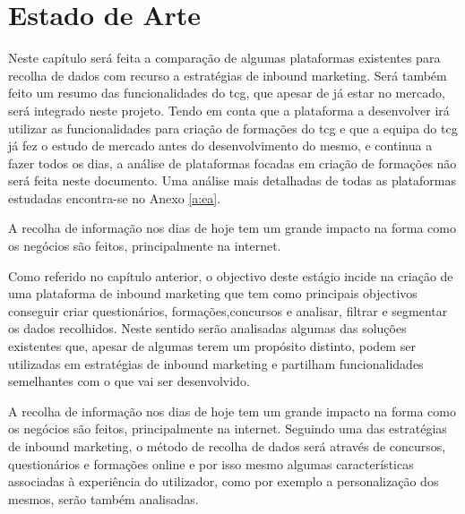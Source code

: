 \chapter{Estado de Arte}
\label{sec:estado-arte}

Neste capítulo será feita a comparação de algumas plataformas existentes para recolha de dados com recurso a estratégias de inbound marketing. Será também feito um resumo das funcionalidades do \acrshort{tcg}, que apesar de já estar no mercado, será integrado neste projeto. Tendo em conta que a plataforma a desenvolver irá utilizar as funcionalidades para criação de formações do \acrshort{tcg} e que a equipa do \acrlong{tcg} já fez o estudo de mercado antes do desenvolvimento do mesmo, e continua a fazer todos os dias, a análise de plataformas focadas em criação de formações não será feita neste documento. Uma análise mais detalhadas de todas as plataformas estudadas encontra-se no Anexo \ref{a:ea}.

A recolha de informação nos dias de hoje tem um grande impacto na forma como os negócios são feitos, principalmente na internet.

Como referido no capítulo anterior, o objectivo deste estágio incide na criação de uma plataforma de inbound marketing que tem como principais objectivos conseguir criar  questionários, formações,concursos e analisar, filtrar e segmentar os dados recolhidos. Neste sentido serão analisadas algumas das soluções existentes que, apesar de algumas terem um propósito distinto, podem ser utilizadas em estratégias de inbound marketing e partilham funcionalidades semelhantes com o que vai ser desenvolvido. 

A recolha de informação nos dias de hoje tem um grande impacto na forma como os negócios são feitos, principalmente na internet. Seguindo uma das estratégias de inbound marketing, o método de recolha de dados será através de concursos, questionários e formações online e por isso mesmo algumas características associadas à experiência do utilizador, como por exemplo a personalização dos mesmos, serão também analisadas.


